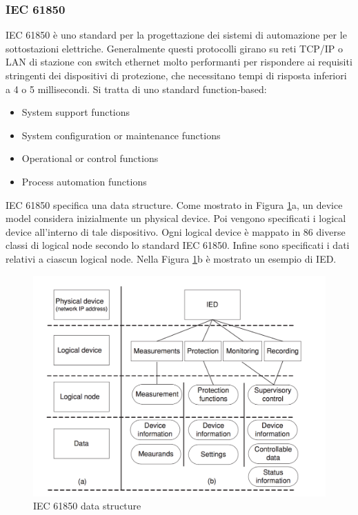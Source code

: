 \subsubsection{IEC 61850}
IEC 61850 è uno standard per la progettazione dei sistemi di automazione per le sottostazioni elettriche. Generalmente questi protocolli girano su reti TCP/IP o LAN di stazione con switch ethernet molto performanti per rispondere ai requisiti stringenti dei dispositivi di protezione, che necessitano tempi di risposta inferiori a 4 o 5 millisecondi. Si tratta di uno standard function-based:
\begin{itemize}
	\item System support functions
	\item System configuration or maintenance functions
	\item Operational or control functions
	\item Process automation functions
\end{itemize}
IEC 61850 specifica una data structure. Come mostrato in Figura \ref{fig:iec61850}a, un device model considera inizialmente un physical device. Poi vengono specificati i logical device all'interno di tale dispositivo. Ogni logical device è mappato in 86 diverse classi di logical node secondo lo standard IEC 61850. Infine sono specificati i dati relativi a ciascun logical node. Nella Figura \ref{fig:iec61850}b è mostrato un esempio di IED.
\begin{figure}[h]
	\centering
	\includegraphics[scale=0.350]{imgs/iec61850.png}
	\caption{IEC 61850 data structure} \label{fig:iec61850}
\end{figure}

